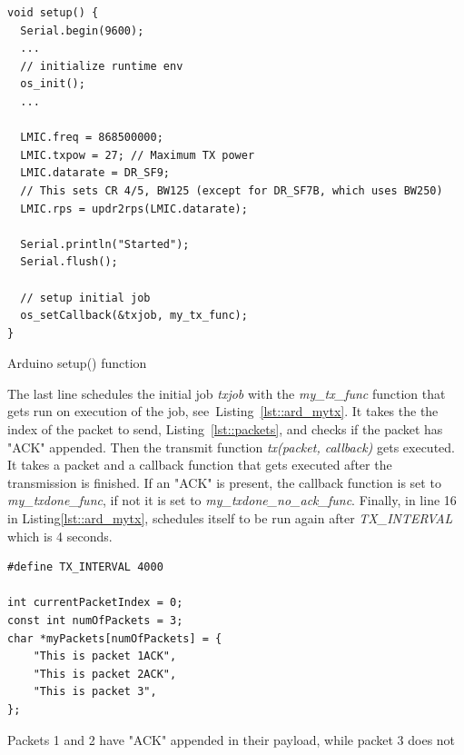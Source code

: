 \begin{listing}[h]
    \begin{verbatim}
void setup() {
  Serial.begin(9600);
  ...
  // initialize runtime env
  os_init();
  ...
  
  LMIC.freq = 868500000;
  LMIC.txpow = 27; // Maximum TX power
  LMIC.datarate = DR_SF9;
  // This sets CR 4/5, BW125 (except for DR_SF7B, which uses BW250)
  LMIC.rps = updr2rps(LMIC.datarate);

  Serial.println("Started");
  Serial.flush();

  // setup initial job
  os_setCallback(&txjob, my_tx_func);
}
    \end{verbatim}
    \caption{Arduino setup() function}
    \label{lst::ard_setup}
    
\end{listing}

The last line schedules the initial job  \emph{txjob} with the \emph{my\_tx\_func} function that gets run
on execution of the job, see~Listing~\ref{lst::ard_mytx}. It takes the the index of the packet to send, Listing~\ref{lst::packets}, and
checks if the packet has "ACK" appended. Then the transmit function \emph{tx(packet, callback)} gets executed. 
It takes a packet and a callback function that gets executed after the transmission is finished. 
If an "ACK" is present, the callback function is set to \emph{my\_txdone\_func}, if not it is set to \emph{my\_txdone\_no\_ack\_func}.
Finally, in line 16 in Listing\ref{lst::ard_mytx}, schedules itself to be run again after \emph{TX\_INTERVAL} which is 4 seconds.


\begin{listing}[h]
    \begin{verbatim}
#define TX_INTERVAL 4000

int currentPacketIndex = 0;
const int numOfPackets = 3;
char *myPackets[numOfPackets] = {
    "This is packet 1ACK", 
    "This is packet 2ACK", 
    "This is packet 3",
};
    \end{verbatim}
    \caption{Packets 1 and 2 have "ACK" appended in their payload, while packet 3 does not}
    \label{lst::packets}
    
\end{listing}


